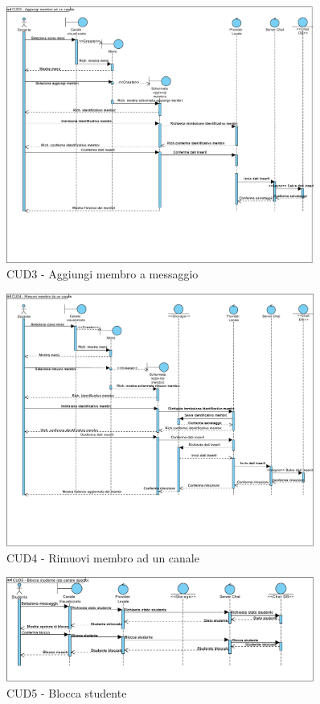 \begin{figure}
	\centering
	\includegraphics[width=0.9\textwidth]{imgs/gruppo6/sequence/CUD3_aggiungi_membro_ad_un_canale.pdf}
	\caption{CUD3 - Aggiungi membro a messaggio}
	\label{fig:seq-cud3}
\end{figure}

\begin{figure}
	\centering
	\includegraphics[width=0.9\textwidth]{imgs/gruppo6/sequence/CUD4_rimuovi_membro_ad_un_canale.pdf}
	\caption{CUD4 - Rimuovi membro ad un canale}
	\label{fig:seq-cud4}
\end{figure}

\begin{figure}
	\centering
	\includegraphics[width=0.9\textwidth]{imgs/gruppo6/sequence/CUD5_blocca_studente.pdf}
	\caption{CUD5 - Blocca studente}
	\label{fig:seq-cud5}
\end{figure}

